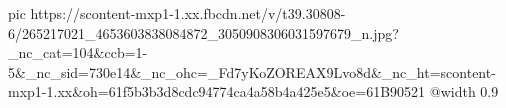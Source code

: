  
 
 
 
 

\ifcmt
  pic https://scontent-mxp1-1.xx.fbcdn.net/v/t39.30808-6/265217021_4653603838084872_3050908306031597679_n.jpg?_nc_cat=104&ccb=1-5&_nc_sid=730e14&_nc_ohc=_Fd7yKoZOREAX9Lvo8d&_nc_ht=scontent-mxp1-1.xx&oh=61f5b3b3d8cdc94774ca4a58b4a425e5&oe=61B90521
  @width 0.9
\fi
